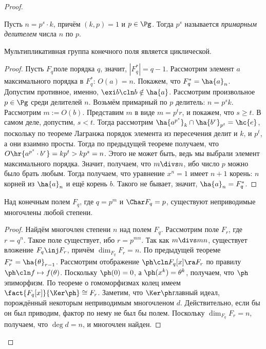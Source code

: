 \documentclass[a4paper]{article}
\newcommand{\kph}{\Ker \ph}
\begin{document}
\begin{proof}
\begin{df}
Пусть $n=p^s \cdot k$, причём $(k,p)=1$ и $p \in \Pg$. Тогда $p^s$  называется \emph{примарным делителем}
числа $n$ по $p$.
\end{df}

\begin{theorem}
Мультипликативная группа конечного поля является циклической.
\end{theorem}
\begin{proof}
Пусть $F_q$\т поле порядка $q$, значит, $|F_q^*|=q-1$. Рассмотрим  элемент $a$ максимального порядка в
$F_q^*$: $O(a)=n$. Покажем, что $F_q^*=\ha{a}_n$. Допустим противное, именно, $\exi b\cln b \notin \ha{a}$.
Рассмотрим произвольное $p \in \Pg$ среди делителей $n$. Возьмём примарный по $p$ делитель: $n=p^sk$.
Рассмотрим $m := O(b)$. Представим $m$ в виде $m=p^tr$, и покажем, что $s \ge t$. В самом деле, допустим, $s
< t$. Тогда рассмотрим $\ha{a^{p^s}}_k\cap\ha{b^r}_{p^t}=\hc{e}$, поскольку по теореме Лагранжа порядок
элемента из пересечения делит и $k$, и $p^t$, а они взаимно просты. Тогда по предыдущей теореме получаем, что
$O\hr{a^{p^s}\cdot b^r}=kp^t>kp^s=n$. Этого не может быть, ведь мы выбрали элемент максимального порядка.
Значит, получаем, что $m \divs n$, ибо число $p$ можно было брать любым. Тогда получаем, что уравнение
$x^n=1$ имеет $n+1$ корень: $n$ корней из $\ha{a}_n$ и ещё корень $b$. Такого не бывает, значит,
$\ha{a}_n=F_q^*$.
\end{proof}

\begin{theorem}
Над конечным полем $F_q$, где $q = p^m$ и $\Char F_q = p$, существуют неприводимые многочлены любой степени.
\end{theorem}
\begin{proof}
Найдём многочлен степени $n$ над полем $F_q$. Рассмотрим поле $F_r$,  где $r = q^n$. Такое поле существует,
ибо $r = p^{mn}$. Так как $m \divs mn$, существует вложение $F_q \inj F_r$, причём $\dim_{F_q} F_r=n$. По
предыдущей теореме $F^*_r=\ha{\theta}_{r-1}$. Рассмотрим отображение $\ph\cln F_q[x] \ra F_r$ по правилу $\ph\cln f
\mapsto f(\theta)$. Поскольку $\ph(0) = 0$, а $\ph(x^k) = \theta^k$, получаем, что $\ph$\т эпиморфизм. По
теореме о гомоморфизмах колец имеем $\fact{F_q[x]}{\kph} \cong F_r$. Заметим, что $\kph$\т главный идеал,
порождённый некоторым неприводимым многочленом $d$. Действительно, если бы он был приводим, фактор по нему не
был бы полем. Поскольку $\dim_{F_q} F_r = n$, получаем, что $\deg d = n$, и многочлен найден.
\end{proof}


\end{proof}
\end{document}
